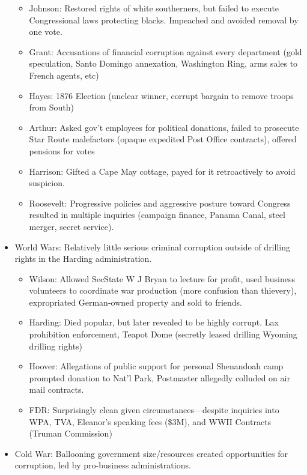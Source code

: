 \documentclass[
]{article}
\begin{document}
\begin{itemize}
  \begin{itemize}
  \item
    Johnson: Restored rights of white southerners, but failed to execute
    Congressional laws protecting blacks. Impeached and avoided removal
    by one vote.
  \item
    Grant: Accusations of financial corruption against every department
    (gold speculation, Santo Domingo annexation, Washington Ring, arms
    sales to French agents, etc)
  \item
    Hayes: 1876 Election (unclear winner, corrupt bargain to remove
    troops from South)
  \item
    Arthur: Asked gov't employees for political donations, failed to
    prosecute Star Route malefactors (opaque expedited Post Office
    contracts), offered pensions for votes
  \item
    Harrison: Gifted a Cape May cottage, payed for it retroactively to
    avoid suspicion.
  \item
    Roosevelt: Progressive policies and aggressive posture toward
    Congress resulted in multiple inquiries (campaign finance, Panama
    Canal, steel merger, secret service).
  \end{itemize}
\item
  World Wars: Relatively little serious criminal corruption outside of
  drilling rights in the Harding administration.

  \begin{itemize}
  \item
    Wilson: Allowed SecState W J Bryan to lecture for profit, used
    business volunteers to coordinate war production (more confusion
    than thievery), expropriated German-owned property and sold to
    friends.
  \item
    Harding: Died popular, but later revealed to be highly corrupt. Lax
    prohibition enforcement, Teapot Dome (secretly leased drilling
    Wyoming drilling rights)
  \item
    Hoover: Allegations of public support for personal Shenandoah camp
    prompted donation to Nat'l Park, Postmaster allegedly colluded on
    air mail contracts.
  \item
    FDR: Surprisingly clean given circumstances---despite inquiries into
    WPA, TVA, Eleanor's speaking fees (\$3M), and WWII Contracts (Truman
    Commission)
  \end{itemize}
\item
  Cold War: Ballooning government size/resources created opportunities
  for corruption, led by pro-business administrations.


\end{itemize}
\end{document}
